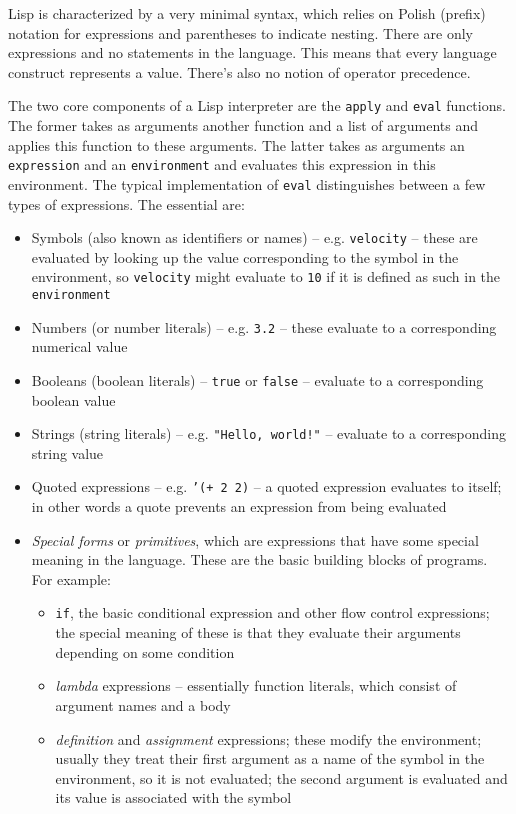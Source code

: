 Lisp is characterized by a very minimal syntax, which relies on Polish (prefix)
notation for expressions and parentheses to indicate nesting. There are only
expressions and no statements in the language. This means that every language
construct represents a value. There's also no notion of operator precedence.

The two core components of a Lisp interpreter are the \texttt{apply} and
\texttt{eval} functions\cite[Section~4.1]{sicp, c2_eval_apply}. The
former takes as arguments another function and a list of arguments and applies
this function to these arguments. The latter takes as arguments an
\texttt{expression} and an \texttt{environment} and evaluates this expression in
this environment. The typical implementation of \texttt{eval} distinguishes
between a few types of expressions. The essential are:
\begin{itemize}
	\item Symbols (also known as identifiers or names) --
          e.g. \texttt{velocity} -- these are evaluated by looking up the value
          corresponding to the symbol in the environment, so \texttt{velocity}
          might evaluate to \texttt{10} if it is defined as such in the
          \texttt{environment}
	\item Numbers (or number literals) -- e.g. \texttt{3.2} -- these
          evaluate to a corresponding numerical value
	\item Booleans (boolean literals) -- \texttt{true} or \texttt{false} --
          evaluate to a corresponding boolean value
	\item Strings (string literals) -- e.g. \texttt{"Hello, world!"} --
          evaluate to a corresponding string value
	\item Quoted expressions -- e.g. \texttt{'(+ 2 2)} -- a quoted
          expression evaluates to itself; in other words a quote prevents an
          expression from being evaluated
	\item \textit{Special forms} or \textit{primitives}, which are
          expressions that have some special meaning in the language. These are
          the basic building blocks of programs. For example:
	\begin{itemize}
		\item \texttt{if}, the basic conditional expression and other
                  flow control expressions; the special meaning of these is that
                  they evaluate their arguments depending on some condition
		\item \textit{lambda} expressions -- essentially function
                  literals, which consist of argument names and a body
		\item \textit{definition} and \textit{assignment} expressions;
                  these modify the environment; usually they treat their first
                  argument as a name of the symbol in the environment, so it is
                  not evaluated; the second argument is evaluated and its value
                  is associated with the symbol
	\end{itemize}
\end{itemize}

